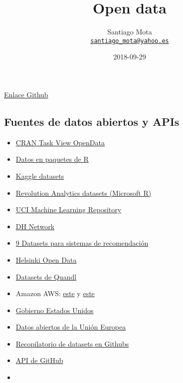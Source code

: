 \documentclass[]{article}
\title{Open data}
\author{Santiago Mota


\newline \href{mailto:santiago_mota@yahoo.es}{\nolinkurl{santiago\_mota@yahoo.es}}}
\date{2018-09-29}
\providecommand{\tightlist}{%
  \setlength{\itemsep}{0pt}\setlength{\parskip}{0pt}}
\begin{document}
\maketitle

\href{https://github.com/santiagomota/Open_Data}{Enlace Github}

\subsection{Fuentes de datos abiertos y
APIs}\label{fuentes-de-datos-abiertos-y-apis}

\begin{itemize}
\tightlist
\item
  \href{https://github.com/ropensci/opendata}{CRAN Task View OpenData}
\item
  \href{http://stat.ethz.ch/R-manual/R-patched/library/datasets/html/00Index.html}{Datos
  en paquetes de R}
\item
  \href{https://www.kaggle.com/datasets}{Kaggle datasets}
\item
  \href{https://mran.revolutionanalytics.com/documents/data/}{Revolution
  Analytics datasets (Microsoft R)}
\item
  \href{http://archive.ics.uci.edu/ml/}{UCI Machine Learning Repository}
\item
  \href{http://opendhn.dhnetwork.opendata.arcgis.com/}{DH Network}
\item
  \href{http://www.lab41.org/nine-datasets-for-investigating-recommender-systems/?utm_campaign=Data\%2BElixir\&utm_medium=email\&utm_source=Data_Elixir_71}{9
  Datasets para sistemas de recomendación}
\item
  \href{http://www.hri.fi/en/}{Helsinki Open Data}
\item
  \href{https://www.quandl.com/search?query=}{Datasets de Quandl}
\item
  Amazon AWS: \href{http://aws.amazon.com/es/datasets/}{este} y
  \href{https://aws.amazon.com/es/public-data-sets/}{este}
\item
  \href{http://www.data.gov/}{Gobierno Estados Unidos}
\item
  \href{http://open-data.europa.eu/es/data/}{Datos abiertos de la Unión
  Europea}
\item
  \href{http://www.datasciencecentral.com/profiles/blogs/great-github-list-of-public-data-sets}{Recopilatorio
  de datasets en Githubs}
\item
  \href{https://developer.github.com/v3/}{API de GitHub}
\item

\end{itemize}
\end{document}
